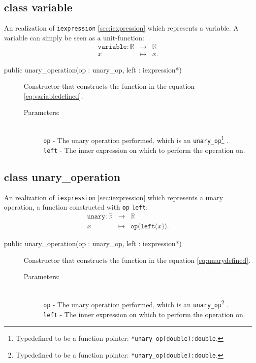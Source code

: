 \documentclass[a4paper,11pt]{kth-mag}
\newcommand{\RR}{\ensuremath{\mathbb{R}}}
\begin{document}
\subsection{class variable} An realization of \texttt{iexpression}
\ref{sec:iexpression} which represents a variable. A variable can simply be
seen as a unit-function:
\begin{eqnarray}
    \label{eq:variabledefined}
    \texttt{variable}: \RR &\rightarrow& \RR \nonumber \\
    x &\mapsto& x .
\end{eqnarray}
\begin{description}
    \item[public unary\_operation(op : unary\_op, left : iexpression*)] Constructor 
    that constructs the function in the equation \ref{eq:variabledefined}. 
    \begin{description}
        \item[Parameters:]~\\
            \verb+op+ - The unary operation performed, which is an \texttt{unary\_op}\footnote{Typedefined to
            be a function pointer: \texttt{*unary\_op(double):double}.} .\\
            \verb+left+ - The inner expression on which to perform the
            operation on.
    \end{description}
\end{description}

\subsection{class unary\_operation} An realization of \texttt{iexpression}
\ref{sec:iexpression} which represents a unary operation, a function
constructed with \texttt{op} \texttt{left}:
\begin{eqnarray}
    \label{eq:unarydefined}
    \texttt{unary}:\RR &\rightarrow& \RR \nonumber \\
    x &\mapsto& \texttt{op(left(}x\texttt{))}. 
\end{eqnarray}

\begin{description}
    \item[public unary\_operation(op : unary\_op, left : iexpression*)] Constructor 
    that constructs the function in the equation \ref{eq:unarydefined}. 
    \begin{description}
        \item[Parameters:]~\\
            \verb+op+ - The unary operation performed, which is an \texttt{unary\_op}\footnote{Typedefined to
            be a function pointer: \texttt{*unary\_op(double):double}.} .\\
            \verb+left+ - The inner expression on which to perform the
            operation on.
    \end{description}
\end{description}
\end{document}
